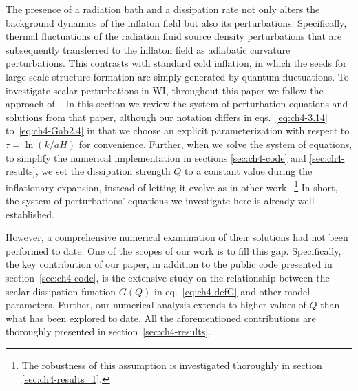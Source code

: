 The presence of a radiation bath and a dissipation rate not only alters the background dynamics of the inflaton field but also its perturbations. Specifically, thermal fluctuations of the radiation fluid source density perturbations that are subsequently transferred to the inflaton field as adiabatic curvature perturbations. This contrasts with standard cold inflation, in which the seeds for large-scale structure formation are simply generated by quantum fluctuations. To investigate scalar perturbations in WI, throughout this paper we follow the approach of~\cite{Ramos:2013nsa}. In this section we review the system of perturbation equations and solutions from that paper, although our notation differs in eqs.~\eqref{eq:ch4-3.14} to~\eqref{eq:ch4-Gab2.4} in that we choose an explicit parameterization with respect to $\tau=\ln(k/aH)$  for convenience.
Further, when we solve the system of equations, to simplify the numerical implementation in sections \ref{sec:ch4-code} and \ref{sec:ch4-results}, we set the dissipation strength $Q$ to a constant value during the inflationary expansion, instead of letting it evolve as in other work~\cite{Ramos:2013nsa}.\footnote{The robustness of this assumption is investigated thoroughly in section \ref{sec:ch4-results_1}.} In short, the system of perturbations' equations we investigate here is already well established. 

However, a comprehensive numerical examination of their solutions had not been performed to date. One of the scopes of our work is to fill this gap. Specifically, the key contribution of our paper, in addition to the public code presented in section~\ref{sec:ch4-code}, is the extensive study on the relationship between the scalar dissipation function $G(Q)$ in eq.~\eqref{eq:ch4-defG} and other model parameters. Further, our numerical analysis extends to higher values of $Q$ than what has been explored to date. All the aforementioned contributions are thoroughly presented in section~\ref{sec:ch4-results}. 

